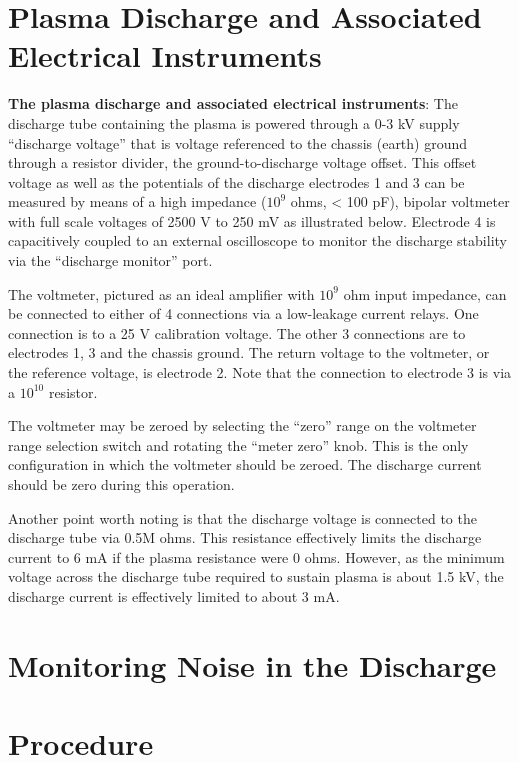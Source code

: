 \documentclass{../lab}
\begin{document}
\section{Plasma Discharge and Associated Electrical Instruments}

\textbf{The plasma discharge and associated electrical instruments}: The discharge tube containing the plasma is powered through a 0-3 kV supply ``discharge voltage'' that is voltage referenced to the chassis (earth) ground through a resistor divider, the ground-to-discharge voltage offset. This offset voltage as well as the potentials of the discharge electrodes 1 and 3 can be measured by means of a high impedance ($10^9$ ohms, < 100 pF), bipolar voltmeter with full scale voltages of 2500 V to 250 mV as illustrated below. Electrode 4 is capacitively coupled to an external oscilloscope to monitor the discharge stability via the ``discharge monitor'' port.

The voltmeter, pictured as an ideal amplifier with $10^9$ ohm input impedance, can be connected to either of 4 connections via a low-leakage current relays. One connection is to a 25 V calibration voltage. The other 3 connections are to electrodes 1, 3 and the chassis ground. The return voltage to the voltmeter, or the reference voltage, is electrode 2. Note that the connection to electrode 3 is via a $10^{10}$ resistor.

The voltmeter may be zeroed by selecting the ``zero'' range on the voltmeter range selection switch and rotating the ``meter zero'' knob. This is the only configuration in which the voltmeter should be zeroed. The discharge current should be zero during this operation.

Another point worth noting is that the discharge voltage is connected to the discharge tube via 0.5M ohms. This resistance effectively limits the discharge current to 6 mA if the plasma resistance were 0 ohms. However, as the minimum voltage across the discharge tube required to sustain plasma is about 1.5 kV, the discharge current is effectively limited to about 3 mA.

\section{Monitoring Noise in the Discharge}

\section{Procedure}
\end{document}
